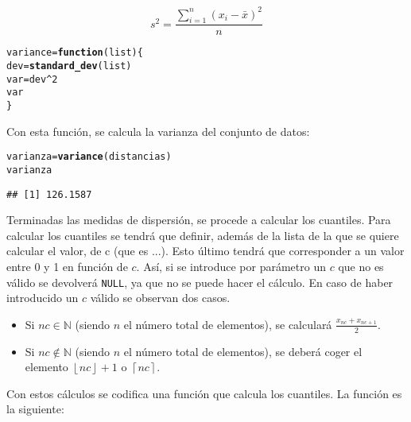 \documentclass[12pt]{report}\usepackage[]{graphicx}\usepackage[dvipsnames]{xcolor}
\makeatletter
\newcommand{\hlnum}[1]{\textcolor[rgb]{0.686,0.059,0.569}{#1}}%
\newcommand{\hlopt}[1]{\textcolor[rgb]{0,0,0}{#1}}%
\newcommand{\hlstd}[1]{\textcolor[rgb]{0.345,0.345,0.345}{#1}}%
\newcommand{\hlkwa}[1]{\textcolor[rgb]{0.161,0.373,0.58}{\textbf{#1}}}%
\newcommand{\hlkwb}[1]{\textcolor[rgb]{0.69,0.353,0.396}{#1}}%
\newcommand{\hlkwc}[1]{\textcolor[rgb]{0.333,0.667,0.333}{#1}}%
\newcommand{\hlkwd}[1]{\textcolor[rgb]{0.737,0.353,0.396}{\textbf{#1}}}%
\newenvironment{kframe}{%
 \def\at@end@of@kframe{}%
 \ifinner\ifhmode%
  \def\at@end@of@kframe{\end{minipage}}%
  \begin{minipage}{\columnwidth}%
 \fi\fi%
 \def\FrameCommand##1{\hskip\@totalleftmargin \hskip-\fboxsep
 \colorbox{shadecolor}{##1}\hskip-\fboxsep
     \hskip-\linewidth \hskip-\@totalleftmargin \hskip\columnwidth}%
 \MakeFramed {\advance\hsize-\width
   \@totalleftmargin\z@ \linewidth\hsize
   \@setminipage}}%
 {\par\unskip\endMakeFramed%
 \at@end@of@kframe}
\newenvironment{knitrout}{}{} %
\makeatother
\begin{document}
			$$
			s^2 = \frac{\displaystyle\sum_{i=1}^n (x_i-\bar{x})^2}{n}
			$$
			
\begin{knitrout}
\color{fgcolor}\begin{kframe}
\begin{alltt}
\hlstd{variance} \hlkwb{=} \hlkwa{function}\hlstd{(}\hlkwc{list}\hlstd{)\{}
        \hlstd{dev} \hlkwb{=} \hlkwd{standard_dev}\hlstd{(list)}
        \hlstd{var} \hlkwb{=} \hlstd{dev}\hlopt{^}\hlnum{2}
        \hlstd{var}
\hlstd{\}}
\end{alltt}
\end{kframe}
\end{knitrout}
			
			Con esta función, se calcula la varianza del conjunto de datos:
			
\begin{knitrout}
\color{fgcolor}\begin{kframe}
\begin{alltt}
\hlstd{varianza} \hlkwb{=} \hlkwd{variance}\hlstd{(distancias)}
\hlstd{varianza}
\end{alltt}
\begin{verbatim}
## [1] 126.1587
\end{verbatim}
\end{kframe}
\end{knitrout}
			
			Terminadas las medidas de dispersión, se procede a calcular los cuantiles. Para calcular los cuantiles se tendrá que definir, además de la lista de la que se quiere calcular el valor, de c (que es ...). Esto último tendrá que corresponder a un valor entre 0 y 1 en función de $c$. Así, si se introduce por parámetro un $c$ que no es válido se devolverá \texttt{NULL}, ya que no se puede hacer el cálculo. En caso de haber introducido un $c$ válido se observan dos casos.
			
			\begin{itemize}
				\item Si $nc \in \mathbb{N}$ (siendo $n$ el número total de elementos), se calculará $\frac{x_{nc}+x_{nc+1}}{2}$. 
				\item Si $nc \not \in \mathbb{N}$ (siendo $n$ el número total de elementos), se deberá coger el elemento $\left\lfloor nc \right\rfloor + 1 $ o $ \left\lceil nc \right\rceil$. 
			\end{itemize}
			
			Con estos cálculos se codifica una función que calcula los cuantiles. La función es la siguiente:
			
\end{document}
